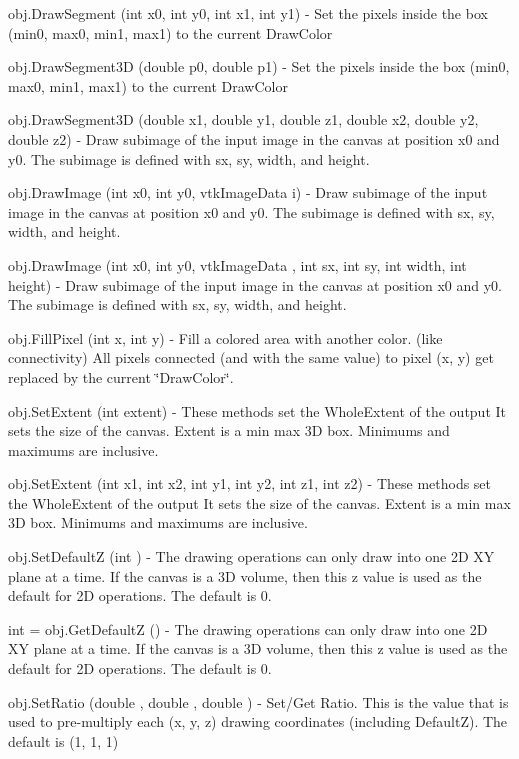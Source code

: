 \begin{DoxyItemize}
\item {\ttfamily obj.\-Draw\-Segment (int x0, int y0, int x1, int y1)} -\/ Set the pixels inside the box (min0, max0, min1, max1) to the current Draw\-Color  
\item {\ttfamily obj.\-Draw\-Segment3\-D (double p0, double p1)} -\/ Set the pixels inside the box (min0, max0, min1, max1) to the current Draw\-Color  
\item {\ttfamily obj.\-Draw\-Segment3\-D (double x1, double y1, double z1, double x2, double y2, double z2)} -\/ Draw subimage of the input image in the canvas at position x0 and y0. The subimage is defined with sx, sy, width, and height.  
\item {\ttfamily obj.\-Draw\-Image (int x0, int y0, vtk\-Image\-Data i)} -\/ Draw subimage of the input image in the canvas at position x0 and y0. The subimage is defined with sx, sy, width, and height.  
\item {\ttfamily obj.\-Draw\-Image (int x0, int y0, vtk\-Image\-Data , int sx, int sy, int width, int height)} -\/ Draw subimage of the input image in the canvas at position x0 and y0. The subimage is defined with sx, sy, width, and height.  
\item {\ttfamily obj.\-Fill\-Pixel (int x, int y)} -\/ Fill a colored area with another color. (like connectivity) All pixels connected (and with the same value) to pixel (x, y) get replaced by the current \char`\"{}\-Draw\-Color\char`\"{}.  
\item {\ttfamily obj.\-Set\-Extent (int extent)} -\/ These methods set the Whole\-Extent of the output It sets the size of the canvas. Extent is a min max 3\-D box. Minimums and maximums are inclusive.  
\item {\ttfamily obj.\-Set\-Extent (int x1, int x2, int y1, int y2, int z1, int z2)} -\/ These methods set the Whole\-Extent of the output It sets the size of the canvas. Extent is a min max 3\-D box. Minimums and maximums are inclusive.  
\item {\ttfamily obj.\-Set\-Default\-Z (int )} -\/ The drawing operations can only draw into one 2\-D X\-Y plane at a time. If the canvas is a 3\-D volume, then this z value is used as the default for 2\-D operations. The default is 0.  
\item {\ttfamily int = obj.\-Get\-Default\-Z ()} -\/ The drawing operations can only draw into one 2\-D X\-Y plane at a time. If the canvas is a 3\-D volume, then this z value is used as the default for 2\-D operations. The default is 0.  
\item {\ttfamily obj.\-Set\-Ratio (double , double , double )} -\/ Set/\-Get Ratio. This is the value that is used to pre-\/multiply each (x, y, z) drawing coordinates (including Default\-Z). The default is (1, 1, 1)  

\end{DoxyItemize}
